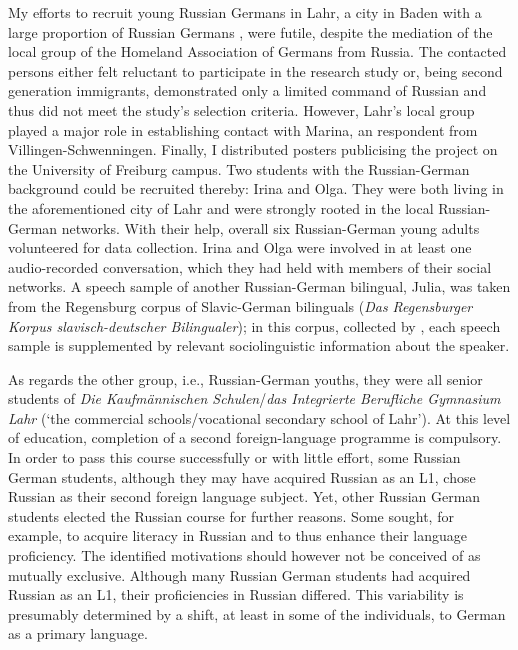 My efforts to recruit young Russian Germans in Lahr, a city in Baden with a large proportion of Russian Germans \citep[cf.][]{roll03}, were futile, despite the mediation of the local group of the Homeland Association of Germans from Russia. The contacted persons either felt reluctant to participate in the research study or, being second generation immigrants, demonstrated only a limited command of Russian and thus did not meet the study's selection criteria. However, Lahr's local group played a major role in establishing contact with Marina, an respondent from Villingen-Schwenningen. Finally, I distributed posters publicising the project on the University of Freiburg campus. Two students with the Russian-German background could be recruited thereby: Irina and Olga. They were both living in the aforementioned city of Lahr and were strongly rooted in the local Russian-German networks. With their help, overall six Russian-German young adults volunteered for data collection. Irina and Olga were involved in at least one audio-recorded conversation, which they had held with members of their social networks. A speech sample of another Russian-German bilingual, Julia, was taken from the Regensburg corpus of Slavic-German bilinguals (\textit{Das Regensburger Korpus slavisch-deutscher Bilingualer}); in this corpus, collected by \citet{rebislav}, each speech sample is supplemented by relevant sociolinguistic information about the speaker.

As regards the other group, i.e., Russian-German youths, they were all senior students of \textit{Die Kaufmännischen Schulen}\slash \textit{das Integrierte Berufliche Gymnasium Lahr} (`the commercial schools\slash vocational secondary school of Lahr'). At this level of education, completion of a second foreign-language programme is compulsory. In order to pass this course successfully or with little effort, some Russian German students, although they may have acquired Russian as an L1, chose Russian as their second foreign language subject. Yet, other Russian German students elected the Russian course for further reasons. Some sought, for example, to acquire literacy in Russian and to thus enhance their language proficiency. The identified motivations should however not be conceived of as mutually exclusive. Although many Russian German students had acquired Russian as an L1, their proficiencies in Russian differed. This variability is presumably determined by a shift, at least in some of the individuals, to German as a primary language.


